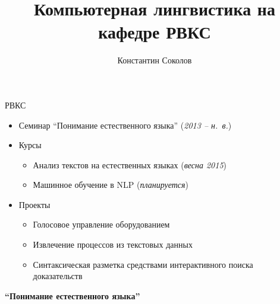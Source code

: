 \documentclass{beamer}
\begin{document}
\title{\Large{Компьютерная лингвистика на кафедре РВКС}}
\author{Константин Соколов}
\date{} 

\begin{frame}
    \thispagestyle{empty}
    \titlepage
\end{frame}


\begin{frame}{РВКС}
\setcounter{framenumber}{1}
\begin{small}
\begin{itemize}
    \item Семинар ``Понимание естественного языка'' (\textit{2013 -- н.~в.})
    \item Курсы 
        \begin{itemize}
            \item Анализ текстов на естественных языках (\textit{весна 2015})
            \item Машинное обучение в NLP (\textit{планируется})
        \end{itemize}
    \item Проекты
        \begin{itemize}
        	    \item Голосовое управление оборудованием
            \item Извлечение процессов из текстовых данных
            \item Синтаксическая разметка средствами интерактивного поиска доказательств
        \end{itemize}
\end{itemize}
\end{small}
\end{frame}

\begin{frame}{}
\begin{center}
	\textbf{``Понимание естественного языка''}
\end{center}
\end{frame}
\end{document}
